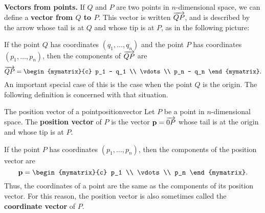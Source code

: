 \noindent\textbf{Vectors from points.}
If $Q$ and $P$ are two points in $n$-dimensional space, we can define
a \textbf{vector from $Q$ to $P$}. This
vector is written $\overrightarrow{QP}$, and is described by the arrow whose
tail is at $Q$ and whose tip is at $P$, as in the following picture:
\begin{center}
\end{center}
If the point $Q$ has coordinates $(q_1,\ldots,q_n)$ and the point $P$
has coordinates $(p_1,\ldots,p_n)$, then the components of
$\overrightarrow{QP}$ are
\begin{equation*}
  \longvect{QP} =
  \begin{mymatrix}{c}
    p_1 - q_1 \\
    \vdots    \\
    p_n - q_n
  \end{mymatrix}.
\end{equation*}
An important special case of this is the case when the point $Q$ is
the origin. The following definition is concerned with that situation.

\begin{definition}{The position vector of a point}{positionvector}
  Let $P$ be a point in $n$-dimensional space. The \textbf{position
    vector} of $P$ is the vector
  ${\bf p} = \overrightarrow{0P}$ whose tail is at the origin and whose tip
  is at $P$.
  \begin{center}
  \end{center}
  If the point $P$ has coordinates $(p_1,\ldots,p_n)$, then the
  components of the position vector are
  \begin{equation*}
    \vect{p} =
    \begin{mymatrix}{c}
      p_1    \\
      \vdots \\
      p_n
    \end{mymatrix}.
  \end{equation*}
  Thus, the coordinates of a point are the same as the components of
  its position vector. For this reason, the position vector is also
  sometimes called the
  \textbf{coordinate vector} of $P$.
\end{definition}

